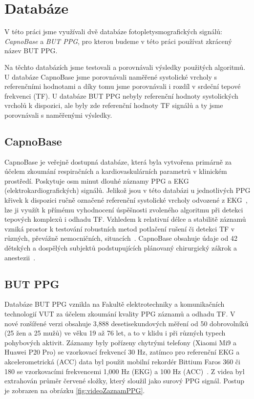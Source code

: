 \raggedbottom
\chapter{Databáze}
\label{chap:databaze}

V této práci jsme využívali dvě databáze fotopletysmografických signálů: \textit{CapnoBase} a \textit{\acl{BUT PPG}}, pro kterou budeme v této práci používat zkrácený název \acs{BUT PPG}.

Na těchto databázích jsme testovali a porovnávali výsledky použitých algoritmů.
U databáze CapnoBase jsme porovnávali naměřené systolické vrcholy s referenčními hodnotami a díky tomu jsme porovnávali i rozdíl v srdeční tepové frekvenci (\acs{TF}).
U databáze \acs{BUT PPG} nebyly referenční hodnoty systolických vrcholů k dispozici, ale byly zde referenční hodnoty \acs{TF} signálů a ty jsme porovnávali s naměřenými výsledky.

\section{CapnoBase}
\label{sec:capnobase}

CapnoBase je veřejně dostupná databáze, která byla vytvořena primárně za účelem zkoumání respiračních a kardiovaskulárních parametrů v klinickém prostředí.
Poskytuje osm minut dlouhé záznamy \acs{PPG} a EKG (elektrokardiografických) signálů.
Jelikož jsou v této databázi u jednotlivých \acs{PPG} křivek k dispozici ručně označené referenční systolické vrcholy odvozené z EKG~\cite{CapnoBase}, lze ji využít k přímému vyhodnocení úspěšnosti zvoleného algoritmu při detekci tepových komplexů i odhadu \acs{TF}.
Vzhledem k relativní délce a stabilitě záznamů vzniká prostor k testování robustních metod potlačení rušení či detekci \acs{TF} v různých, převážně nemocničních, situacích~\cite{Karlen2013, Charlton2022}.
CapnoBase obsahuje údaje od 42 dětských a dospělých subjektů podstupujících plánovaný chirurgický zákrok a anestezii~\cite{Charlton2022}.

\section{\acs{BUT PPG}}
\label{sec:but_ppg}

Databáze \acs{BUT PPG} vznikla na Fakultě elektrotechniky a komunikačních technologií \acs{VUT} za účelem zkoumání kvality \acs{PPG} záznamů a odhadu \acs{TF}.
V nové rozšířené verzi obsahuje 3,888 desetisekundových měření od 50 dobrovolníků (25 žen a 25 mužů) ve věku 19 až 76 let, a to v klidu i při různých typech pohybových aktivit.
Záznamy byly pořízeny chytrými telefony (Xiaomi Mi9 a Huawei P20 Pro) se vzorkovací frekvencí 30 Hz, zatímco pro referenční EKG a akcelerometrická (ACC) data byl použit mobilní rekordér Bittium Faros 360 či 180 se vzorkovacími frekvencemi 1,000 Hz (EKG) a 100 Hz (ACC)~\cite{BUT_PPG}.
Z videa byl extrahován průměr červené složky, který sloužil jako surový \acs{PPG} signál.
Postup je zobrazen na obrázku \ref{fig:videoZaznamPPG}.

